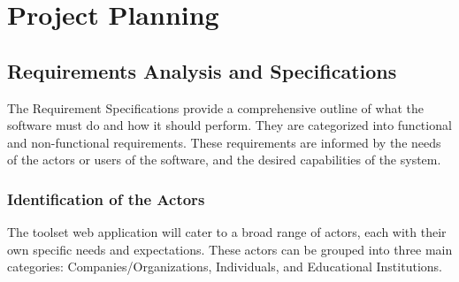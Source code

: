 \chapter{Project Planning}
\minitoc
\newpage


\setcounter{secnumdepth}{2} %
\section{Requirements Analysis and Specifications}
The Requirement Specifications provide a comprehensive outline of what the software must do and how it should perform. They are categorized into functional and non-functional requirements. These requirements are informed by the needs of the actors or users of the software, and the desired capabilities of the system.

\subsection{Identification of the Actors}
The  toolset web application will cater to a broad range of actors, each with their own specific needs and expectations. These actors can be grouped into three main categories: Companies/Organizations, Individuals, and Educational Institutions.

